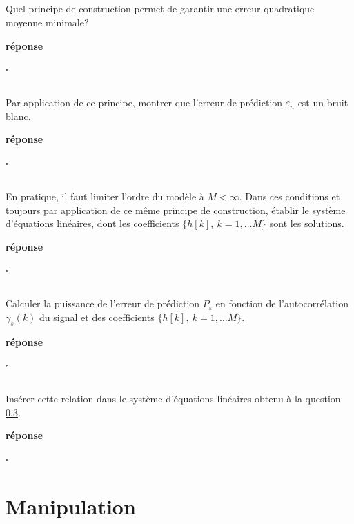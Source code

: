 \documentclass{article}
\newcommand{\debutrep}[1]{\color{blue}\begin{center} \hrulefill \textbf{ #1 } \hrulefill \end{center} }
\newcommand{\finrep}{\vspace*{5mm}\hfill $\square$\color{black}\vspace*{5mm}}
\begin{document}
\subsection{}
Quel principe de construction  permet de garantir une erreur quadratique moyenne minimale? \\

\debutrep{réponse}

\finrep

\subsection{}
Par application de ce principe, montrer que l'erreur de prédiction $\varepsilon_n$ est  un bruit blanc.\\

\debutrep{réponse}

\finrep

\subsection{}
\label{eq.3} 
En pratique, il faut limiter  l'ordre du modèle à $M<\infty$. Dans ces conditions et toujours par application de ce même principe de construction, établir le système d'équations linéaires, dont les coefficients $\{h[k],~k=1,\ldots M\}$ sont les solutions.\\

\debutrep{réponse}

\finrep


\subsection{}
Calculer la puissance de l'erreur de prédiction $P_{\varepsilon}$ en fonction de l'autocorrélation $\gamma_s(k)$ du signal et des coefficients $\{h[k],~k=1,\ldots M\}$.\\


\debutrep{réponse}

\finrep

\subsection{}
\label{eq.5}
Insérer cette relation dans le système 	d'équations linéaires  obtenu à la question \ref{eq.3}.\\

\debutrep{réponse}

\finrep


\clearpage
\section{Manipulation}
\end{document}
